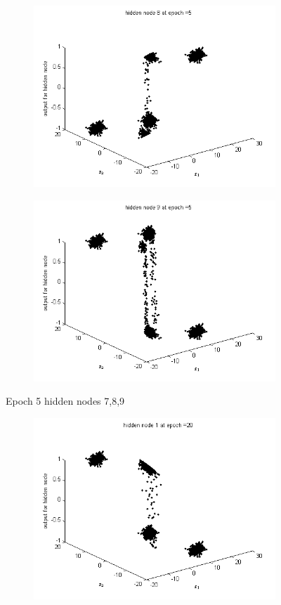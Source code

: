 \documentclass{article}
\begin{document}
\begin{flushleft}
\begin{figure}
\begin{subfigure}{.3\textwidth}
\end{subfigure}%
\begin{subfigure}{.3\textwidth}
  \centering
  \includegraphics[width=.8\linewidth]{Classification/linearlySeparable/h5_8}
  
\end{subfigure}
\begin{subfigure}{.3\textwidth}
  \centering
  \includegraphics[width=.8\linewidth]{Classification/linearlySeparable/h5_9}
  
\end{subfigure}
\caption{Epoch 5 hidden nodes 7,8,9}
\end{figure}
\newpage
\begin{figure}
\begin{subfigure}{.3\textwidth}
  \centering
  \includegraphics[width=.8\linewidth]{Classification/linearlySeparable/h20_1}
 

\end{subfigure}
\end{figure}
\end{flushleft}
\end{document}
